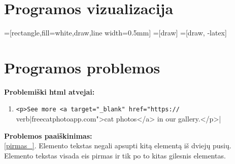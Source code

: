 \documentclass[a4paper,10pt]{article}
\begin{document}
\section{Programos vizualizacija}
=[rectangle,fill=white,draw,line width=0.5mm]
=[draw]
=[draw, -latex] 

\section{Programos problemos}
\textbf{Problemiški html atvejai:}
\begin{enumerate}
 \item{
    \label{pirmas_} 
    \verb|<p>See more <a target="_blank" href="https://|\
    \\verb|freecatphotoapp.com">cat photos</a> in our gallery.</p>|} 
 
\end{enumerate}
\textbf{Problemos paaiškinimas:}
\\\ref{pirmas_}. Elemento tekstas negali apsupti kitą elementą iš dviejų pusių. Elemento tekstas visada eis pirmas ir tik po to kitas gilesnis elementas.
\end{document}
